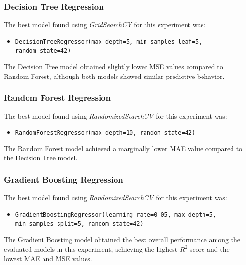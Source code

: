 \documentclass[12pt]{article}
\begin{document}
\subsubsection{Decision Tree Regression}

The best model found using \textit{GridSearchCV} for this experiment was:

\begin{itemize}
    \item \texttt{DecisionTreeRegressor(max\_depth=5, min\_samples\_leaf=5, random\_state=42)}
\end{itemize}

The Decision Tree model obtained slightly lower MSE values compared to Random Forest, although both models showed similar predictive behavior.

\subsubsection{Random Forest Regression}

The best model found using \textit{RandomizedSearchCV} for this experiment was:

\begin{itemize}
    \item \texttt{RandomForestRegressor(max\_depth=10, random\_state=42)}
\end{itemize}

The Random Forest model achieved a marginally lower MAE value compared to the Decision Tree model.

\subsubsection{Gradient Boosting Regression}

The best model found using \textit{RandomizedSearchCV} for this experiment was:

\begin{itemize}
    \item \texttt{GradientBoostingRegressor(learning\_rate=0.05, max\_depth=5, min\_samples\_split=5, random\_state=42)}
\end{itemize}

The Gradient Boosting model obtained the best overall performance among the evaluated models in this experiment, achieving the highest $R^2$ score and the lowest MAE and MSE values.
\end{document}

